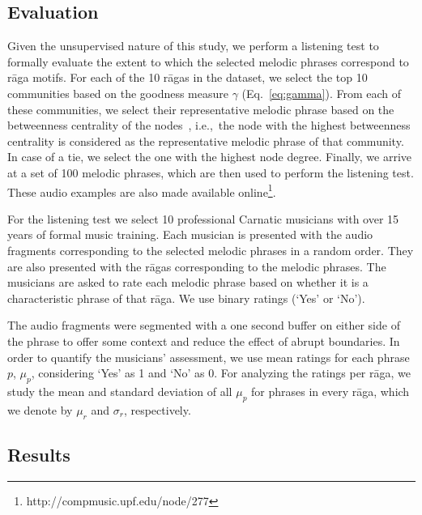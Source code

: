 \subsection{Evaluation}


Given the unsupervised nature of this study, we perform a listening test to formally evaluate the extent to which the selected melodic phrases correspond to r\={a}ga motifs. For each of the 10 r\={a}gas in the dataset, we select the top 10 communities based on the goodness measure $\gamma$ (Eq.~\ref{eq:gamma}). From each of these communities, we select their representative melodic phrase based on the betweenness centrality of the nodes~\cite{newman2003structure}, i.e.,~the node with the highest betweenness centrality is considered as the representative melodic phrase of that community. In case of a tie, we select the one with the highest node degree. Finally, we  arrive at a set of 100 melodic phrases, which are then used to perform the listening test. These audio examples are also made available online\footnote{http://compmusic.upf.edu/node/277}.

For the listening test we select 10 professional Carnatic musicians with over 15 years of formal music training. Each musician is presented with the audio fragments corresponding to the selected melodic phrases in a random order. They are also presented with the r\={a}gas corresponding to the melodic phrases. The musicians are asked to rate each melodic phrase based on whether it is a characteristic phrase of that r\={a}ga. We use binary ratings (`Yes' or `No'). 

The audio fragments were segmented with a one second buffer on either side of the phrase to offer some context and reduce the effect of abrupt boundaries. %
In order to quantify the musicians' assessment, we use mean ratings for each phrase $p$, $\mu_p$, considering `Yes' as 1 and `No' as 0. For analyzing the ratings per r\={a}ga, we study the mean and standard deviation of all $\mu_p$ for phrases in every r\={a}ga, which we denote by $\mu_r$ and $\sigma_r$, respectively.


\subsection{Results}


